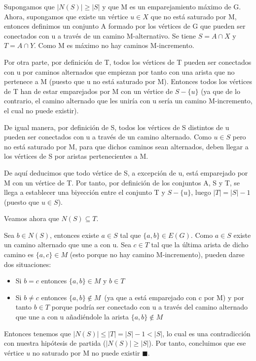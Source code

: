 \documentclass[a4paper,1pt]{report}
\begin{document}
Supongamos que $|N(S)|\geq |S|$ y que M es un emparejamiento máximo de G. Ahora, supongamos que existe un vértice $u\in X$ que no está saturado por M, entonces definimos un conjunto A formado por los vértices de G que pueden ser conectados con u a través de un camino M-alternativo. Se tiene $S=A\cap X$ y $T=A\cap Y$. Como M es máximo no hay caminos M-incremento. 

Por otra parte, por definición de T, todos los vértices de T pueden ser conectados con u por caminos alternados que empiezan por tanto con una arista que no pertenece a M (puesto que u no está saturado por M). Entonces todos los vértices de T han de estar emparejados por M con un vértice de $S- \{u\}$ (ya que de lo contrario, el camino alternado que les uniría con u sería un camino M-incremento, el cual no puede existir).

De igual manera, por definición de S, todos los vértices de S distintos de u pueden ser conectados con u a través de un camino alternado.  Como $u\in S$ pero no está saturado por M, para que dichos caminos sean alternados, deben llegar a los vértices de S por aristas pertenecientes a M.

De aquí deducimos que todo vértice de S, a excepción de u, está emparejado por M con un vértice de T. Por tanto, por definición de los conjuntos A, S y T, se llega a establecer una biyección entre el conjunto T y $S-\{ u \}$, luego $|T| = |S| - 1$ (puesto que $u \in S$).

Veamos ahora que $N(S)\subseteq  T$.

Sea $b\in N(S)$, entonces existe $a\in S$ tal que $\{a,b\}\in E(G)$. 
Como $a\in S$ existe un camino alternado que une a con u. Sea $c\in T$ tal que la última arista de dicho camino es $\{a,c\}\in M$ (esto porque no hay camino M-incremento), pueden darse dos situaciones:
\begin{itemize}
 \item Si $b=c$ entonces $\{a,b\}\in M$ y  $b\in T$
 \item Si $b\neq c$ entonces $\{a,b\}\not \in M$~(ya que a está emparejado con c por M) y por tanto $b\in T$ porque podría ser conectado con u a través del camino alternado que
une a con u añadiéndole la arista $\{a,b\}\not \in M$
\end{itemize}

Entonces tenemos que $|N(S)| \leq |T| = |S| - 1 < |S|$, lo cual es una contradicción con
nuestra hipótesis de partida ($|N(S)| \geq |S|$). Por tanto, concluimos que ese vértice $u$ no
saturado por M no puede existir $\blacksquare$.
\end{document}
